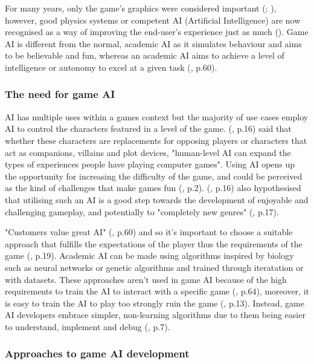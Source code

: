\documentclass[11pt, a4paper]{article}
\begin{document}
For many years, only the game's graphics were considered important (\cite{yap2002grid}; \cite{blow2004game}), however, good physics systems or competent AI (Artificial Intelligence) are now recognised as a way of improving the end-user's experience just as much (\cite{blow2004game}). Game AI is different from the normal, academic AI as it simulates behaviour and aims to be believable and fun, whereas an academic AI aims to achieve a level of intelligence or autonomy to excel at a given task (\cite{nareyek2004ai}, p.60).

\subsubsection{The need for game AI}

AI has multiple uses within a games context but the majority of use cases employ AI to control the characters featured in a level of the game. \citeauthor{laird2001human} (\citeyear{laird2001human}, p.16) said that whether these characters are replacements for opposing players or characters that act as companions, villains and plot devices, "human-level AI can expand the types of experiences people have playing computer games". Using AI opens up the opportunity for increasing the difficulty of the game, and could be perceived as the kind of challenges that make games fun (\cite{buro2004call}, p.2). \citeauthor{laird2001human} (\citeyear{laird2001human}, p.16) also hypothesised that utilising such an AI is a good step towards the development of enjoyable and challenging gameplay, and potentially to "completely new genres" (\cite{laird2001human}, p.17). 

 "Customers value great AI" (\cite{nareyek2004ai}, p.60) and so it's important to choose a suitable approach that fulfills the expectations of the player thus the requirements of the game (\cite{millington2019ai}, p.19). Academic AI can be made using algorithms inspired by biology such as neural networks or genetic algorithms and trained through iteratation or with datasets. These approaches aren't used in game AI because of the high requirements to train the AI to interact with a specific game (\cite{nareyek2004ai}, p.64), moreover, it is easy to train the AI to play too strongly ruin the game (\cite{tozour2002evolution}, p.13). Instead, game AI developers embrace simpler, non-learning algorithms due to them being easier to understand, implement and debug (\cite{tozour2002evolution}, p.7).

 \subsubsection{Approaches to game AI development}
\end{document}
